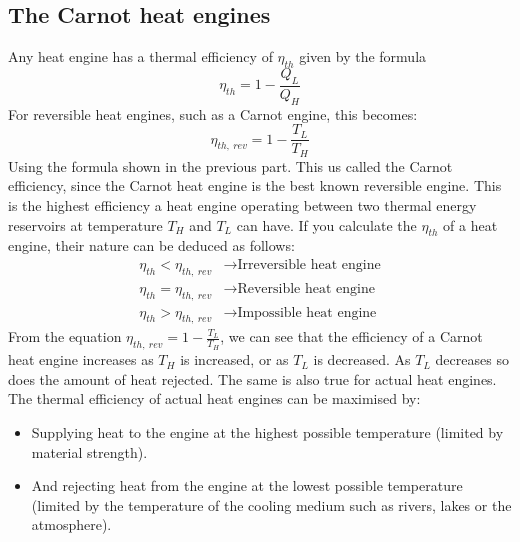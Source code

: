 \subsection{The Carnot heat engines}
Any heat engine has a thermal efficiency of $\eta_{th}$ given by the formula
\begin{equation}
  \eta_{th} = 1 - \frac{Q_L}{Q_H}
\end{equation}
For reversible heat engines, such as a Carnot engine, this becomes:
\begin{equation}
  \eta_{th, \ rev} = 1 - \frac{T_L}{T_H}
\end{equation}
Using the formula shown in the previous part. This us called the Carnot efficiency, since the Carnot heat engine is the best known reversible engine. This is the highest efficiency a heat engine operating between two thermal energy reservoirs at temperature $T_H$ and $T_L$ can have. If you calculate the $\eta_{th}$ of a heat engine, their nature can be deduced as follows:
\begin{align}
  \eta_{th} < \eta_{th, \ rev} & \rightarrow \textrm{Irreversible heat engine} \\
  \eta_{th} = \eta_{th, \ rev} & \rightarrow \textrm{Reversible heat engine}   \\
  \eta_{th} > \eta_{th, \ rev} & \rightarrow \textrm{Impossible heat engine}
\end{align}
From the equation $\eta_{th, \ rev} = 1 - \frac{T_L}{T_H}$, we can see that the efficiency of a Carnot heat engine increases as $T_H$ is increased, or as $T_L$ is decreased. As $T_L$ decreases so does the amount of heat rejected. The same is also true for actual heat engines. The thermal efficiency of actual heat engines can be maximised by:
\begin{itemize}[noitemsep]
  \item Supplying heat to the engine at the highest possible temperature (limited by material strength).
  \item And rejecting heat from the engine at the lowest possible temperature (limited by the temperature of the cooling medium such as rivers, lakes or the atmosphere).
\end{itemize}
